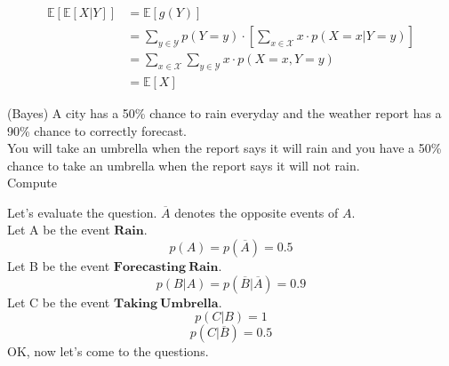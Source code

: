 \documentclass[a4paper, 12pt, answers]{exam} %
\begin{document}
\begin{questions}
\begin{solution}
\begin{parts}
    		\begin{equation*}
    		\begin{aligned}
    		\mathbb{E}\left[\mathbb{E}\left[X|Y\right]\right]&=\mathbb{E}\left[g(Y)\right]\\
    		&=\sum_{y \in \mathcal{Y}}p\left(Y=y\right) \cdot \left[\sum_{x \in \mathcal{X}}x\cdot p\left(X=x|Y=y\right)\right]\\
    		&=\sum_{x \in \mathcal{X}}\sum_{y \in \mathcal{Y}}x \cdot p\left(X=x,Y=y\right)\\
    		&=\mathbb{E}\left[X\right]
    		\end{aligned}
    		\end{equation*} 
    		\end{parts}
    	\end{solution}
	\question (Bayes) A city has a 50\% chance to rain everyday and the weather report has a 90\% chance to correctly forecast.\\
	You will take an umbrella when the report says it will rain and you have a 50\% chance to take an umbrella when the report says it will not rain.\\
	Compute
    \begin{solution}
    	Let's evaluate the question. $\overline{A}$ denotes the opposite events of $A$.\\ 
    	Let A be the event $\mathbf{Rain}$.
    	\begin{equation*}
    	p\left(A\right)=p\left(\overline{A}\right)=0.5
    	\end{equation*}
    	Let B be the event $\mathbf{Forecasting \ Rain}$.
    	\begin{equation*}
    	p\left(B|A\right)=p\left(\overline{B}|\overline{A}\right)=0.9
    	\end{equation*}
    	Let C be the event $\mathbf{Taking \ Umbrella}$.
    	\begin{equation*}
    	p\left(C|B\right)=1
    	\end{equation*}
    	\begin{equation*}
    	p\left(C|\overline{B}\right)=0.5
    	\end{equation*}
    	OK, now let's come to the questions.
    	\begin{parts}

\end{parts}
\end{solution}
\end{questions}
\end{document}
